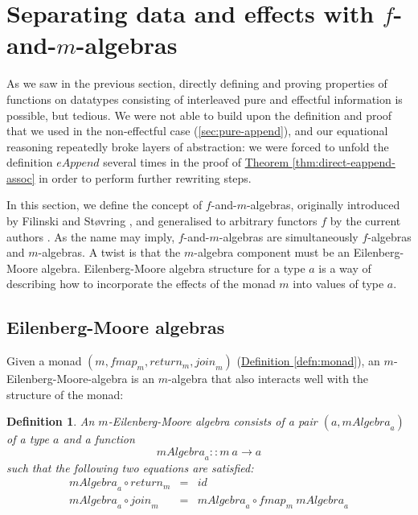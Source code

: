 \documentclass{jfp1}
\newtheorem{definition}{Definition}
\newcommand{\thmref}[1]{\hyperref[#1]{Theorem \ref*{#1}}}
\newcommand{\defref}[1]{\hyperref[#1]{Definition \ref*{#1}}}
\begin{document}
\section{Separating data and effects with $f$-and-$m$-algebras}
\label{sec:f-and-m-algebras}

As we saw in the previous section, directly defining and proving
properties of functions on datatypes consisting of interleaved pure
and effectful information is possible, but tedious. We were not able
to build upon the definition and proof that we used in the
non-effectful case (\autoref{sec:pure-append}), and our equational
reasoning repeatedly broke layers of abstraction: we were forced to
unfold the definition $\mathit{eAppend}$ several times in the proof of
\thmref{thm:direct-eappend-assoc} in order to perform further
rewriting steps.

In this section, we define the concept of $f$-and-$m$-algebras,
originally introduced by Filinski and St\o{}vring
\cite{filinski07inductive}, and generalised to arbitrary functors $f$
by the current authors \cite{atkey12fibrational}. As the name may
imply, $f$-and-$m$-algebras are simultaneously $f$-algebras and
$m$-algebras. A twist is that the $m$-algebra component must be an
Eilenberg-Moore algebra. Eilenberg-Moore algebra structure for a type
$a$ is a way of describing how to incorporate the effects of the monad
$m$ into values of type $a$.

\subsection{Eilenberg-Moore algebras}
\label{sec:eilenberg-moore-algebras}

Given a monad $(m, \mathit{fmap}_m, \mathit{return}_m,
\mathit{join}_m)$ (\defref{defn:monad}), an
$m$-Eilenberg-Moore-algebra is an $m$-algebra that also interacts well
with the structure of the monad:

\begin{definition}
  An $m$-Eilenberg-Moore algebra consists of a pair
  $(a,\mathit{mAlgebra}_a)$ of a type $a$ and a function
  \begin{displaymath}
    \mathit{mAlgebra}_a :: m~a \to a
  \end{displaymath}
  such that the following two equations are satisfied:
  \begin{eqnarray}
    \label{eq:em-alg-return}
    \mathit{mAlgebra}_a \circ \mathit{return}_m & = & \mathit{id} \\
    \label{eq:em-alg-join}
    \mathit{mAlgebra}_a \circ \mathit{join}_m & = & \mathit{mAlgebra}_a \circ \mathit{fmap}_m~\mathit{mAlgebra}_a
  \end{eqnarray}
\end{definition}
\end{document}
